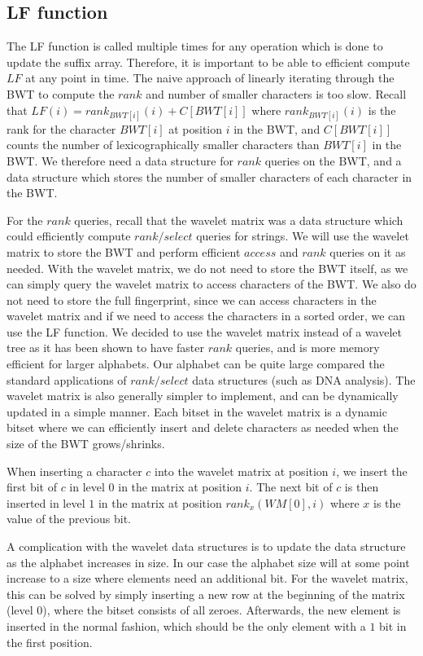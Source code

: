 \subsection*{LF function}

The LF function is called multiple times for any operation which is done to update the
suffix array. Therefore, it is important to be able to efficient compute $LF$ at any point
in time. The naive approach of linearly iterating through the BWT to compute the $rank$
and number of smaller characters is too slow. Recall that $LF(i) = rank_{BWT[i]}(i) +
C[BWT[i]]$ where $rank_{BWT[i]}(i)$ is the rank for the character $BWT[i]$ at position $i$
in the BWT, and $C[BWT[i]]$ counts the number of lexicographically smaller characters than
$BWT[i]$ in the BWT. We therefore need a data structure for $rank$ queries on the BWT, and
a data structure which stores the number of smaller characters of each character in the
BWT. 

For the $rank$ queries, recall that the wavelet matrix was a data structure which could
efficiently compute $rank/select$ queries for strings. We will use the wavelet matrix to
store the BWT and perform efficient $access$ and $rank$ queries on it as needed. With the
wavelet matrix, we do not need to store the BWT itself, as we can simply query the wavelet
matrix to access characters of the BWT. We also do not need to store the full fingerprint,
since we can access characters in the wavelet matrix and if we need to access the
characters in a sorted order, we can use the LF function. We decided to use the wavelet
matrix instead of a wavelet tree as it has been shown to have faster $rank$ queries, and
is more memory efficient for larger alphabets. Our alphabet can be quite large compared
the standard applications of $rank/select$ data structures (such as DNA analysis). The
wavelet matrix is also generally simpler to implement, and can be dynamically updated in a
simple manner. Each bitset in the wavelet matrix is a dynamic bitset where we can
efficiently insert and delete characters as needed when the size of the BWT grows/shrinks.

When inserting a character $c$ into the wavelet matrix at position $i$, we insert the
first bit of $c$ in level $0$ in the matrix at position $i$. The next bit of $c$ is then
inserted in level $1$ in the matrix at position $rank_x(WM[0], i)$ where $x$ is the value
of the previous bit.

A complication with the wavelet data structures is to update the data structure as the
alphabet increases in size. In our case the alphabet size will at some point increase to a
size where elements need an additional bit. For the wavelet matrix, this can be solved by
simply inserting a new row at the beginning of the matrix (level $0$), where the bitset
consists of all zeroes. Afterwards, the new element is inserted in the normal fashion,
which should be the only element with a $1$ bit in the first position.

